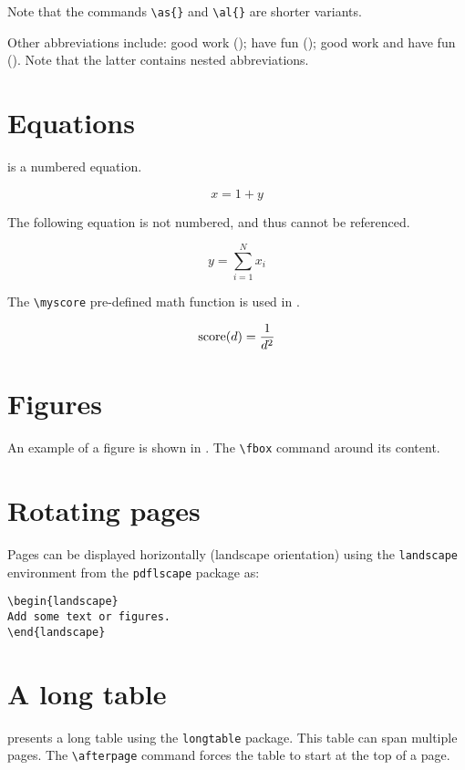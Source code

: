 Note that the commands \verb+\as{}+ and \verb+\al{}+ are shorter variants.

Other abbreviations include: good work (); have fun (); good work and have fun ().
Note that the latter contains nested abbreviations.


\section{Equations}
\label{c2:s:equations}

 is a numbered equation.

\begin{equation}
\label{eq:example1}
x = 1 + y
\end{equation}

The following equation is not numbered, and thus cannot be referenced.

\begin{equation*}
y = \sum_{i=1}^{N}{x_i}
\end{equation*}

The \verb+\myscore+ pre-defined math function is used in .

\begin{equation}
\label{eq:example2}
\operatorname{score}(d) = \frac{1}{d^2}
\end{equation}


\section{Figures}
\label{c2:s:figures}

An example of a figure is shown in . The \verb+\fbox+ command  around its content.




\section{Rotating pages}
\label{c2:s:rotating-pages}

Pages can be displayed horizontally (landscape orientation) using the \verb+landscape+ environment  from the \verb+pdflscape+ package as:

\begin{verbatim}
\begin{landscape}
Add some text or figures.
\end{landscape}
\end{verbatim}


\section{A long table}
\label{c2:s:a-long-table}

 presents a long table using the \verb+longtable+ package.
This table can span multiple pages.
The \verb+\afterpage+ command forces the table to start at the top of a page.

\afterpage{}
